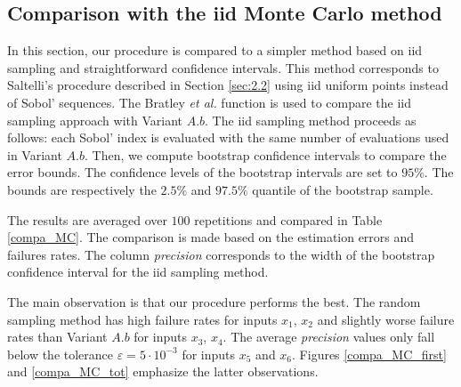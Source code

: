 {\subsection{Comparison with the iid Monte Carlo method}

In this section, our procedure is compared to a simpler \break method based on iid sampling and straightforward confidence intervals. This method corresponds to Saltelli's procedure described in Section \ref{sec:2.2} using iid uniform points instead of Sobol' sequences. The Bratley \textit{et al.} function is used to compare the iid sampling approach with Variant $A.b$. The iid sampling method proceeds as follows: each Sobol' index is evaluated with the same number of evaluations used in Variant $A.b$. Then, we compute bootstrap confidence intervals to compare the error bounds. The confidence levels of the bootstrap intervals are set to $95\%$. The bounds are respectively the $2.5\%$ and $97.5\%$ quantile of the bootstrap sample.  

The results are averaged over $100$ repetitions and compared in Table \ref{compa_MC}. The comparison is made based on the estimation errors and failures rates. The column \textit{precision} corresponds to the width of the bootstrap confidence interval for the iid sampling method.

The main observation is that our procedure performs the best. The random sampling method has high failure rates for inputs $x_1$, $x_2$ and slightly worse failure rates than Variant $A.b$ for inputs $x_3$, $x_4$. The average \textit{precision} values only fall below the tolerance $\varepsilon=5\cdot10^{-3}$ for inputs $x_5$ and $x_6$. Figures \ref{compa_MC_first} and \ref{compa_MC_tot} emphasize the latter observations.


}
